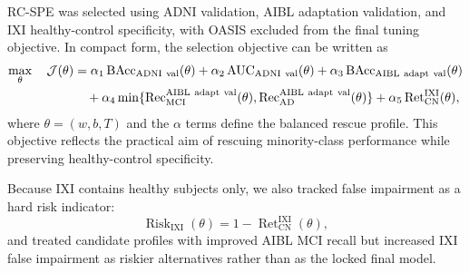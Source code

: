 RC-SPE was selected using ADNI validation, AIBL adaptation validation, and IXI healthy-control specificity, with OASIS excluded from the final tuning objective. In compact form, the selection objective can be written as
\begin{align}
\max_{\theta}
\quad
\mathcal{J}(\theta)
&=
\alpha_1 \operatorname{BAcc}_{\mathrm{ADNI\ val}}(\theta)
+ \alpha_2 \operatorname{AUC}_{\mathrm{ADNI\ val}}(\theta)
+ \alpha_3 \operatorname{BAcc}_{\mathrm{AIBL\ adapt\ val}}(\theta) \notag\\
&\quad
+ \alpha_4
\min\{
\operatorname{Rec}^{\mathrm{AIBL\ adapt\ val}}_{\mathrm{MCI}}(\theta),
\operatorname{Rec}^{\mathrm{AIBL\ adapt\ val}}_{\mathrm{AD}}(\theta)
\}
+ \alpha_5
\operatorname{Ret}^{\mathrm{IXI}}_{\mathrm{CN}}(\theta),
\label{eq:selection_objective}
\end{align}
where $\theta=(w,b,T)$ and the $\alpha$ terms define the balanced rescue profile. This objective reflects the practical aim of rescuing minority-class performance while preserving healthy-control specificity.

Because IXI contains healthy subjects only, we also tracked false impairment as a hard risk indicator:
\begin{equation}
\operatorname{Risk}_{\mathrm{IXI}}(\theta)
=
1-\operatorname{Ret}^{\mathrm{IXI}}_{\mathrm{CN}}(\theta),
\label{eq:ixi_risk}
\end{equation}
and treated candidate profiles with improved AIBL MCI recall but increased IXI false impairment as riskier alternatives rather than as the locked final model.

\begin{center}
\end{center}

